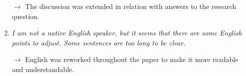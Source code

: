 \documentclass[11pt,a4paper,sans]{moderncv}        %
\begin{document}
\begin{enumerate}
$\rightarrow$ The discussion was extended in relation with answers to the research question.


\medskip

\item \textit{I am not a native English speaker, but it seems that there are some English points to adjust. Some sentences are too long to be clear.}
 
$\rightarrow$ English was reworked throughout the paper to make it more readable and understandable.

\end{enumerate}
\end{document}

